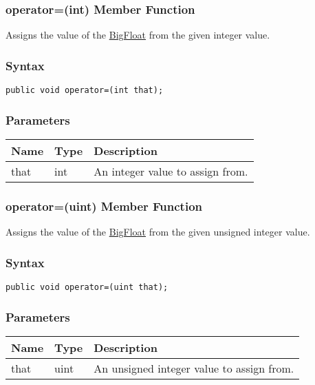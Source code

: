 \documentclass[a4paper,oneside,11.000000pt]{book}
\begin{document}
\hypertarget{System.Numerics.Multiprecision.BigFloat.operator.assign.P.System.Numerics.Multiprecision.BigFloat.int}{\subsubsection*{operator=(int) Member Function}}
\begin{flushleft}
Assigns the value of the \hyperlink{System.Numerics.Multiprecision.BigFloat}{BigFloat} from the given integer value.

\end{flushleft}
\subsubsection*{Syntax}\texttt{public void operator=(int that);}

\subsubsection*{Parameters}
\begin{flushleft}
\begin{supertabular}[l]{lll}
\textbf{Name}
& \textbf{Type}
& \textbf{Description}
\\
\hline
that
& int
& An integer value to assign from.

\\
\end{supertabular}

\end{flushleft}
\clearpage

\hypertarget{System.Numerics.Multiprecision.BigFloat.operator.assign.P.System.Numerics.Multiprecision.BigFloat.uint}{\subsubsection*{operator=(uint) Member Function}}
\begin{flushleft}
Assigns the value of the \hyperlink{System.Numerics.Multiprecision.BigFloat}{BigFloat} from the given unsigned integer value.

\end{flushleft}
\subsubsection*{Syntax}\texttt{public void operator=(uint that);}

\subsubsection*{Parameters}
\begin{flushleft}
\begin{supertabular}[l]{lll}
\textbf{Name}
& \textbf{Type}
& \textbf{Description}
\\
\hline
that
& uint
& An unsigned integer value to assign from.

\\
\end{supertabular}

\end{flushleft}
\clearpage
\end{document}
